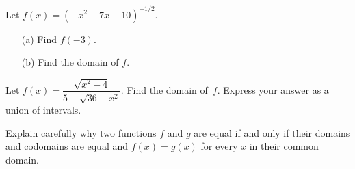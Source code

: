 \begin{prob} Let $f(x)=(-x^2-7x-10)^{-1/2}$.
 \begin{enumerate}
  \item[(a)] Find $f(-3)$.
  \item[(b)] Find the domain of $f$.
 \end{enumerate}
\end{prob}

\begin{prob} Let $f(x)=\dfrac{\sqrt{x^2-4}}{5-\sqrt{36-x^2}}$. Find the domain of~$f$.
Express your answer as a union of intervals.
\end{prob}

\begin{prob} Explain carefully why two functions $f$ and $g$ are equal if and only if
their domains and codomains are equal and $f(x) = g(x)$ for every $x$ in their common domain.
\end{prob}

\endinput
